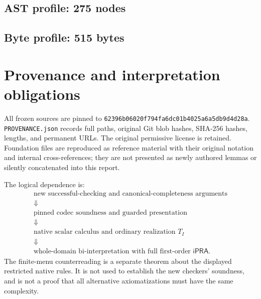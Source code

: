 \documentclass[11pt]{article}
\theoremstyle{definition}
\theoremstyle{remark}
\newcommand{\ipra}{\mathsf{iPRA}}
\begin{document}
\medskip
\noindent\begin{minipage}{\linewidth}
\subsection{AST profile: 275 nodes}

\end{minipage}

\medskip
\noindent\begin{minipage}{\linewidth}
\subsection{Byte profile: 515 bytes}

\end{minipage}

\section{Provenance and interpretation obligations}

All frozen sources are pinned to
\texttt{62396b06020f794fa6dc01b4025a6a5db9d4d28a}.
\texttt{PROVENANCE.json} records full paths, original Git blob hashes,
SHA-256 hashes, lengths, and permanent URLs.  The original permissive
license is retained.  Foundation files are reproduced as reference
material with their original notation and internal cross-references;
they are not presented as newly authored lemmas or silently concatenated
into this report.

The logical dependence is:
\[
\begin{gathered}
\text{new successful-checking and canonical-completeness arguments}\\
\Downarrow\\
\text{pinned codec soundness and guarded presentation}\\
\Downarrow\\
\text{native scalar calculus and ordinary realization }T_I\\
\Downarrow\\
\text{whole-domain bi-interpretation with full first-order }\ipra.
\end{gathered}
\]
The finite-menu counterreading is a separate theorem about the displayed
restricted native rules.  It is not used to establish the new checkers'
soundness, and is not a proof that all alternative axiomatizations must
have the same complexity.
\end{document}
